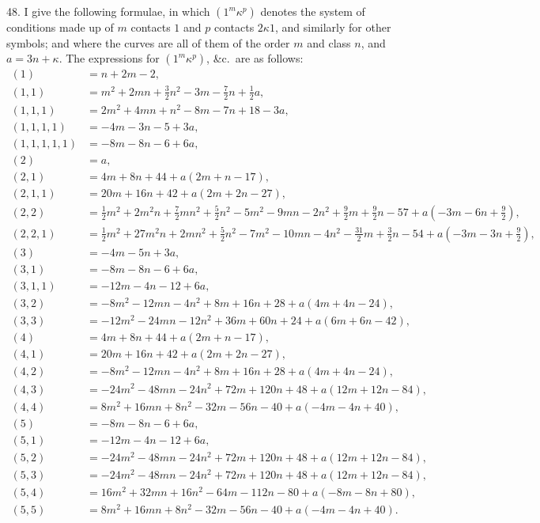 \documentclass[12pt,a4paper]{article}
\begin{document}
48. I give the following formulae, in which $(1^m \kappa^p)$ denotes the system of conditions made up of $m$ contacts $1$ and $p$ contacts $2\kappa 1$, and similarly for other symbols; and where the curves are all of them of the order $m$ and class $n$, and $a = 3n + \kappa$. The expressions for $(1^m \kappa^p)$, \&c.\ are as follows:
\begin{align*}
(1) &= n + 2m - 2,\\
(1, 1) &= m^2 + 2mn + \tfrac{3}{2}n^2 - 3m - \tfrac{7}{2}n + \tfrac{1}{2}a,\\
(1, 1, 1) &= 2m^2 + 4mn + n^2 - 8m - 7n + 18 - 3a,\\
(1, 1, 1, 1) &= -4m - 3n - 5 + 3a,\\
(1, 1, 1, 1, 1) &= -8m - 8n - 6 + 6a,\\
(2) &= a,\\
(2, 1) &= 4m + 8n + 44 + a(2m + n - 17),\\
(2, 1, 1) &= 20m + 16n + 42 + a(2m + 2n - 27),\\
(2, 2) &= \tfrac{1}{2}m^2 + 2m^2n + \tfrac{7}{2}mn^2 + \tfrac{5}{2}n^2 - 5m^2 - 9mn - 2n^2 + \tfrac{9}{2}m + \tfrac{9}{2}n - 57 + a(-3m - 6n + \tfrac{9}{2}),\\
(2, 2, 1) &= \tfrac{1}{2}m^2 + 27m^2n + 2mn^2 + \tfrac{5}{2}n^2 - 7m^2 - 10mn - 4n^2 - \tfrac{31}{2}m + \tfrac{3}{2}n - 54 + a(-3m - 3n + \tfrac{9}{2}),\\
(3) &= -4m - 5n + 3a,\\
(3, 1) &= -8m - 8n - 6 + 6a,\\
(3, 1, 1) &= -12m - 4n - 12 + 6a,\\
(3, 2) &= -8m^2 - 12mn - 4n^2 + 8m + 16n + 28 + a(4m + 4n - 24),\\
(3, 3) &= -12m^2 - 24mn - 12n^2 + 36m + 60n + 24 + a(6m + 6n - 42),\\
(4) &= 4m + 8n + 44 + a(2m + n - 17),\\
(4, 1) &= 20m + 16n + 42 + a(2m + 2n - 27),\\
(4, 2) &= -8m^2 - 12mn - 4n^2 + 8m + 16n + 28 + a(4m + 4n - 24),\\
(4, 3) &= -24m^2 - 48mn - 24n^2 + 72m + 120n + 48 + a(12m + 12n - 84),\\
(4, 4) &= 8m^2 + 16mn + 8n^2 - 32m - 56n - 40 + a(-4m - 4n + 40),\\
(5) &= -8m - 8n - 6 + 6a,\\
(5, 1) &= -12m - 4n - 12 + 6a,\\
(5, 2) &= -24m^2 - 48mn - 24n^2 + 72m + 120n + 48 + a(12m + 12n - 84),\\
(5, 3) &= -24m^2 - 48mn - 24n^2 + 72m + 120n + 48 + a(12m + 12n - 84),\\
(5, 4) &= 16m^2 + 32mn + 16n^2 - 64m - 112n - 80 + a(-8m - 8n + 80),\\
(5, 5) &= 8m^2 + 16mn + 8n^2 - 32m - 56n - 40 + a(-4m - 4n + 40).
\end{align*}
\end{document}
